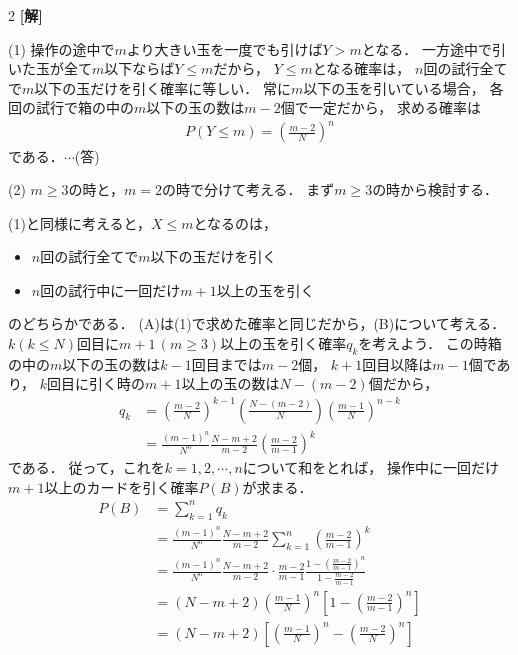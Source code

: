 \documentclass[../../../../main.tex]{subfiles}
\begin{document}
\setcounter{equation}{0}
\begin{oframed}
  
\end{oframed}
\setlength{\columnseprule}{0.4pt}
\begin{multicols}{2}
  {\bf[解]}

  (1)
  操作の途中で$m$より大きい玉を一度でも引けば$Y>m$となる．
  一方途中で引いた玉が全て$m$以下ならば$Y \le m$だから，
  $Y \le m$となる確率は，
  $n$回の試行全てで$m$以下の玉だけを引く確率に等しい．
  常に$m$以下の玉を引いている場合，
  各回の試行で箱の中の$m$以下の玉の数は$m-2$個で一定だから，
  求める確率は
  \begin{align*}
    P(Y \le m) = \left( \frac{m-2}{N} \right)^n
  \end{align*}
  である．$\cdots$(答)

  \vspace{10pt}
  (2)
  $m\ge 3$の時と，$ m = 2$の時で分けて考える．
  まず$m \ge 3$の時から検討する．

  (1)と同様に考えると，$X\le m$となるのは，
  \begin{itemize}
    \item[A] $n$回の試行全てで$m$以下の玉だけを引く \\
    \item[B] $n$回の試行中に一回だけ$m+1$以上の玉を引く
  \end{itemize}
  のどちらかである．
  (A)は(1)で求めた確率と同じだから，(B)について考える．
  $k(k \le N)$回目に$m+1\, (m \ge 3)$以上の玉を引く確率$q_k$を考えよう．
  この時箱の中の$m$以下の玉の数は$k-1$回目までは$m-2$個，
  $k+1$回目以降は$m-1$個であり，
  $k$回目に引く時の$m+1$以上の玉の数は$N-(m-2)$個だから，
  \begin{align*}
    q_k
     & = \left( \frac{m-2}{N} \right)^{k-1} \left( \frac{N-(m-2)}{N} \right)\left( \frac{m-1}{N} \right)^{n-k} \\
     & = \frac{(m-1)^{n}}{N^n}\frac{N-m+2}{m-2} \left(\frac{m-2}{m-1}\right)^{k}
  \end{align*}
  である．
  従って，これを$k=1,2,\cdots,n$について和をとれば，
  操作中に一回だけ$m+1$以上のカードを引く確率$P(B)$が求まる．
  \begin{align*}
    P(B)
     & = \sum_{k=1}^{n}q_k                                                                                                         \\
     & = \frac{(m-1)^{n}}{N^n}\frac{N-m+2}{m-2} \sum_{k=1}^{n}\left(\frac{m-2}{m-1}\right)^{k}                                     \\
     & = \frac{(m-1)^n}{N^n}  \frac{N-m+2}{m-2} \cdot \frac{m-2}{m-1} \frac{1 - \left(\frac{m-2}{m-1}\right)^n}{1-\frac{m-2}{m-1}} \\
     & = (N-m+2) \left( \frac{m-1}{N} \right)^n \left[1- \left( \frac{m-2}{m-1} \right)^n\right]                                   \\
     & = (N-m+2) \left[\left( \frac{m-1}{N} \right)^n - \left( \frac{m-2}{N} \right)^n \right]
  \end{align*}


\end{multicols}
\end{document}
